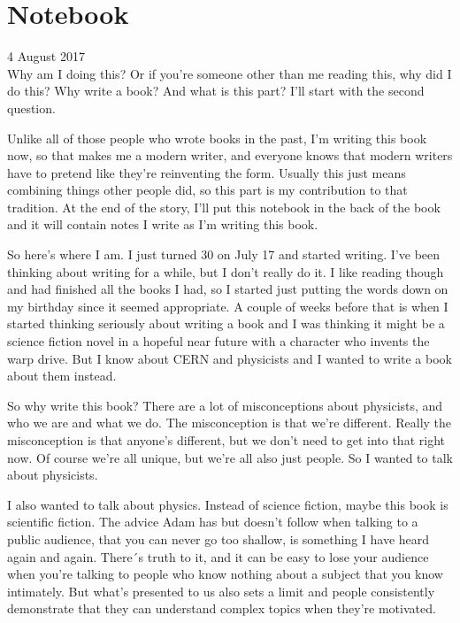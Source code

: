 
\chapter*{Notebook}

4 August 2017\\

Why am I doing this? Or if you're someone other than me reading this, why did I do this? Why write a book? And what is this part? I'll start with the second question.

Unlike all of those people who wrote books in the past, I'm writing this book now, so that makes me a modern writer, and everyone knows that modern writers have to pretend like they're reinventing the form. Usually this just means combining things other people did, so this part is my contribution to that tradition. At the end of the story, I'll put this notebook in the back of the book and it will contain notes I write as I'm writing this book.

So here's where I am. I just turned 30 on July 17 and started writing. I've been thinking about writing for a while, but I don't really do it. I like reading though and had finished all the books I had, so I started just putting the words down on my birthday since it seemed appropriate. A couple of weeks before that is when I started thinking seriously about writing a book and I was thinking it might be a science fiction novel in a hopeful near future with a character who invents the warp drive. But I know about CERN and physicists and I wanted to write a book about them instead.

So why write this book? There are a lot of misconceptions about physicists, and who we are and what we do. The misconception is that we're different. Really the misconception is that anyone's different, but we don't need to get into that right now. Of course we're all unique, but we're all also just people. So I wanted to talk about physicists.

I also wanted to talk about physics. Instead of science fiction, maybe this book is scientific fiction. The advice Adam has but doesn't follow when talking to a public audience, that you can never go too shallow, is something I have heard again and again. There´s truth to it, and it can be easy to lose your audience when you're talking to people who know nothing about a subject that you know intimately. But what's presented to us also sets a limit and people consistently demonstrate that they can understand complex topics when they're motivated.  

